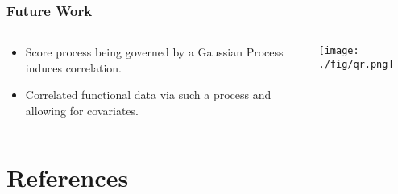 \documentclass[aspectratio=169]{beamer}
\begin{document}
  \begin{frame}
    \frametitle{Future Work}
    \begin{columns}
      \begin{column}{0.5\textwidth}
        \begin{itemize}
          \item Score process being governed by a Gaussian Process induces correlation. 
          \item Correlated functional data via such a process and allowing for covariates.
        \end{itemize}
      \end{column}
      \begin{column}{0.5\textwidth}
        \begin{center}
          \texttt{[image: ./fig/qr.png]}
        \end{center}
      \end{column}
    \end{columns}
    
  \end{frame}
  

  \section{References}
  \begin{frame}[allowframebreaks]
  \frametitle{\secname}
  \tiny{}
  \end{frame}
\end{document}
